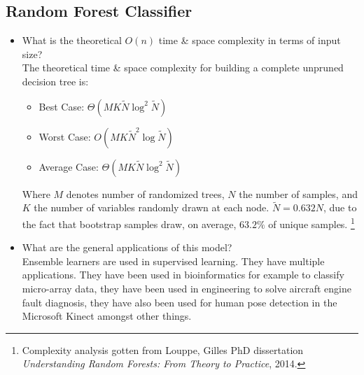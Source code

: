 \documentclass[12pt]{article}
\begin{document}
\subsection*{Random Forest Classifier}
\begin{itemize} 
\item What is the theoretical $O(n)$ time \& space complexity in terms of input size?\\
The theoretical time \& space complexity for building a complete unpruned decision tree is:
\begin{itemize}[noitemsep,nolistsep]
\item Best Case: $\Theta(MK\widetilde{N}\log^2 \widetilde{N})$ 
\item Worst Case: $O(MK\widetilde{N}^2\log \widetilde{N})$ 
\item Average Case: $\Theta(MK\widetilde{N}\log^2 \widetilde{N})$
\end{itemize}
Where $M$ denotes number of randomized trees, $N$ the number of samples, and $K$ the number of variables randomly drawn at each node. $\widetilde{N} = 0.632 N$, due to the fact that bootstrap samples draw, on average, $63.2\%$ of unique samples. 
\footnote{Complexity analysis gotten from Louppe, Gilles PhD dissertation \textit{Understanding Random Forests: From Theory to Practice}, 2014.}

\item What are the general applications of this model?\\
Ensemble learners are used in supervised learning. They have multiple applications. They have been used in bioinformatics for example to classify micro-array data, they have been used in engineering to solve aircraft engine fault diagnosis, they have also been used for human pose detection in the Microsoft Kinect amongst other things. \\ 


\end{itemize}
\end{document}
